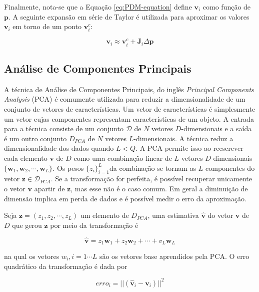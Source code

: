 {Finalmente, nota-se que a Equação \ref{eq:PDM-equation} define $\mathbf{v}_i$ como função de $\mathbf{p}$. A seguinte expansão em série de Taylor é utilizada para aproximar os valores $\mathbf{v}_i$ em torno de um ponto $\mathbf{v}_i^c$:

\begin{equation}
\mathbf{v}_i \approx \mathbf{v}_i^c + \mathbf{J}_i \Delta \mathbf{p}
\label{eq:alg2}
\end{equation}


\subsection{Análise de Componentes Principais}

A técnica de Análise de Componentes Principais, do inglês  \textit{Principal Components Analysis} (PCA) é comumente utilizada para reduzir a
dimensionalidade de um conjunto de vetores de características. Um vetor de características é simplesmente um vetor cujas componentes representam características de um objeto.  A entrada para a
técnica consiste de um conjunto $\mathcal{D}$ de $N$ vetores $D$-dimensionais e a saída é um
outro conjunto $D_{PCA}$ de $N$ vetores $L$-dimensionais. A técnica reduz a
dimensionalidade dos dados quando $L < Q$. A PCA permite isso ao reescrever cada
elemento $\bm{v}$ de $D$ como uma combinação linear de $L$ vetores $D$ dimensionais
$\{ \mathbf{w}_1, \mathbf{w}_2, \cdots, \mathbf{w}_L\}$.
Os pesos $\{z_i\}_{i=1}^L$da combinação se tornam as $L$ componentes do vetor $\mathbf{z} \in \mathcal{D}_{PCA}$. Se a
transformação for perfeita, é possível recuperar unicamente o vetor $\mathbf{v}$ apartir de $\mathbf{z}$, mas esse não é o caso comum. Em geral a diminuição de
dimensão implica em perda de dados e é possível medir o erro da aproximação. 

Seja $\mathbf{z} = (z_1, z_2, \cdots, z_L)$ um elemento de $D_{PCA}$, uma
estimativa $\mathbf{\hat{v}}$ do vetor $\mathbf{v}$ de $D$ que gerou $\mathbf{z}$ por meio da transformação é

\begin{equation}
\mathbf{\hat{v}} = z_1 \mathbf{w}_1 + z_2 \mathbf{w}_2 + \cdots + v_L \mathbf{w}_L
\end{equation}

na qual os vetores $w_i, i = 1 \cdots L$ são os vetores base aprendidos pela
PCA. O erro quadrático da transformação é dada por

\begin{equation}
erro_i = ||(\mathbf{\hat{v}}_{i} - \mathbf{v}_i)||^2
\end{equation}

}
